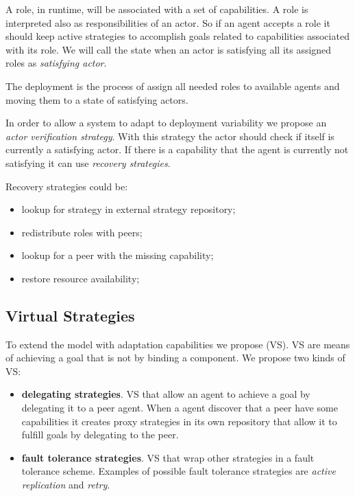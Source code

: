 A role, in runtime, will be associated with a set of capabilities. A role is interpreted also as responsibilities of an actor. So if an agent accepts a role it should keep active strategies to accomplish goals related to capabilities associated with its role.
We will call the state when an actor is satisfying all its assigned roles as \emph{satisfying actor}.

The deployment is the process of assign all needed roles to available agents and moving them to a state of satisfying actors.

In order to allow a system to adapt to deployment variability we propose an \emph{actor verification strategy}. With this strategy the actor should check if itself is currently a satisfying actor. If there is a capability that the agent is currently not satisfying it can use \emph{recovery strategies}.

Recovery strategies could be:
\begin{itemize}
  \item lookup for strategy in external strategy repository;
  \item redistribute roles with peers;
  \item lookup for a peer with the missing capability;
  \item restore resource availability;
\end{itemize}

\subsection{Virtual Strategies}

To extend the model with adaptation capabilities we propose  (VS). VS are means of achieving a goal that is not by binding a component. We propose two kinds of VS:

\begin{itemize}
  \item \textbf{delegating strategies}. VS that allow an agent to achieve a goal by delegating it to a peer agent. When a agent discover that a peer have some capabilities it creates proxy strategies in its own repository that allow it to fulfill goals by delegating to the peer.
  \item \textbf{fault tolerance strategies}. VS that wrap other strategies in a fault tolerance scheme. Examples of possible fault tolerance strategies are \emph{active replication} and \emph{retry}.
\end{itemize}

